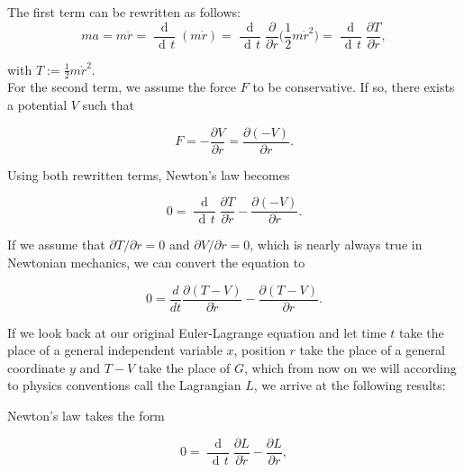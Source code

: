 \documentclass{article}
\DeclareMathOperator{\dd}{\!d\!}
\begin{document}
The first term can be rewritten as follows:
\begin{equation}
ma = m \ddot{r} = \frac{\dd}{\dd t} (m \dot{r}) %
= \frac{\dd}{\dd t} \frac{\partial}{\partial \dot{r}} \Big(\frac{1}{2} m \dot{r}^2 \Big) 
= \frac{\dd}{\dd t} \frac{\partial T}{\partial \dot{r}},
\end{equation}

with $T:=\frac{1}{2} m \dot{r}^2$. \\

For the second term, we assume the force $F$ to be conservative. If so, there exists a potential $V$ such that

\begin{equation}
F = - \frac{\partial V}{\partial r} = \frac{\partial (-V)}{\partial r}.
\end{equation}

Using both rewritten terms, Newton's law becomes


\begin{equation}
0 = \frac{\dd}{\dd t} \frac{\partial T}{\partial \dot{r}} - \frac{\partial (-V)}{\partial r}.
\end{equation}



If we assume that $\partial T/ \partial r = 0$ and $\partial V / \partial \dot{r} = 0$, which is nearly always true in Newtonian mechanics, we can convert the equation to 


\begin{equation}
0 = \frac{d}{dt} \frac{\partial (T-V)}{\partial \dot{r}} - \frac{\partial (T-V)}{\partial r}.
\end{equation}

If we look back at our original Euler-Lagrange equation and let time $t$ take the place of a general independent variable $x$, position $r$ take the place of a general coordinate $y$ and $T-V$ take the place of $G$, which from now on we will according to physics conventions call the Lagrangian $L$, we arrive at the following results:

Newton's law takes the form

\begin{equation}
0 = \frac{\dd}{\dd t} \frac{\partial L}{\partial \dot{r}} - \frac{\partial L}{\partial r}, 
\end{equation}
\end{document}
